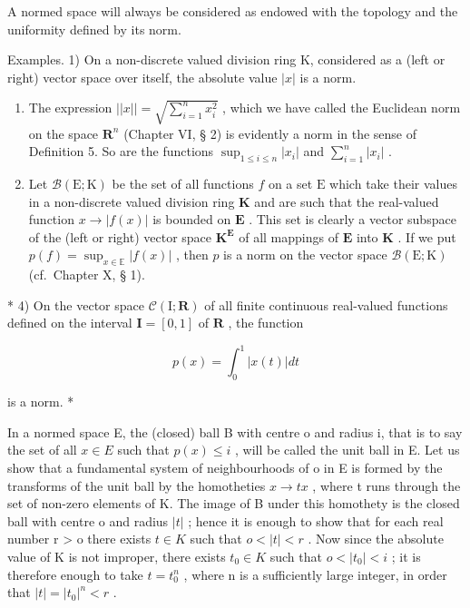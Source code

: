 A normed space will always be considered as endowed with the topology and the uniformity defined by its norm.

Examples. 1) On a non-discrete valued division ring K, considered as a (left or right) vector space over itself, the absolute value \(|x|\) is a norm.

\begin{enumerate}
\def\labelenumi{\arabic{enumi})}
\setcounter{enumi}{1}
\item
  The expression \(||x|| = \sqrt{\sum_{i=1}^{n} x_i^2}\) , which we have called the Euclidean norm on the space \(\mathbf{R}^n\) (Chapter VI, § 2) is evidently a norm in the sense of Definition 5. So are the functions \(\sup_{1 \leqslant i \leqslant n} |x_i|\) and \(\sum_{i=1}^{n} |x_i|\) .
\item
  Let \(\mathcal{B}(\mathrm{E};\mathrm{K})\) be the set of all functions \(f\) on a set \(\mathrm{E}\) which take their values in a non-discrete valued division ring \(\mathbf{K}\) and are such that the real-valued function \(x\to |f(x)|\) is bounded on \(\mathbf{E}\) . This set is clearly a vector subspace of the (left or right) vector space \(\mathbf{K}^{\mathbf{E}}\) of all mappings of \(\mathbf{E}\) into \(\mathbf{K}\) . If we put \(p(f)=\sup_{x\in\mathbb{E}}|f(x)|\) , then \(p\) is a norm on the vector space \(\mathcal{B}(\mathrm{E};\mathrm{K})\) (cf.~Chapter X, § 1).
\end{enumerate}

* 4) On the vector space \(\mathcal{C}(\mathrm{I};\mathbf{R})\) of all finite continuous real-valued functions defined on the interval \(\mathbf{I} = [0,1]\) of \(\mathbf{R}\) , the function

\[
p (x) = \int_ {0} ^ {1} | x (t) | d t
\]

is a norm. *

In a normed space E, the (closed) ball B with centre o and radius i, that is to say the set of all \(x \in E\) such that \(p(x) \leqslant i\) , will be called the unit ball in E. Let us show that a fundamental system of neighbourhoods of o in E is formed by the transforms of the unit ball by the homotheties \(x \to tx\) , where t runs through the set of non-zero elements of K. The image of B under this homothety is the closed ball with centre o and radius \(|t|\) ; hence it is enough to show that for each real number r \textgreater{} o there exists \(t \in K\) such that \(o < |t| < r\) . Now since the absolute value of K is not improper, there exists \(t_{0} \in K\) such that \(o < |t_{0}| < i\) ; it is therefore enough to take \(t = t_{0}^{n}\) , where n is a sufficiently large integer, in order that \(|t| = |t_{0}|^{n} < r\) .

